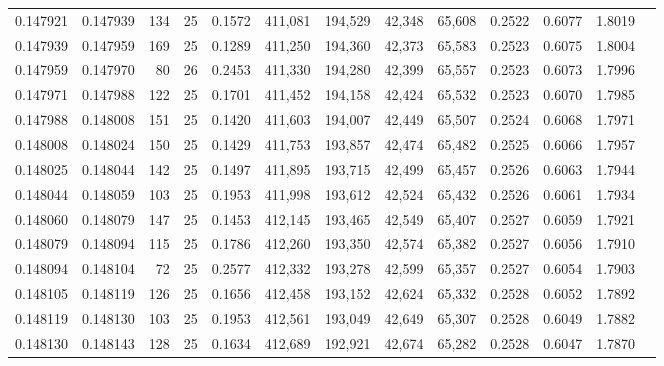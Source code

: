 \begin{tabular}{rrrrrrrrrrrrr}
0.147921 & 0.147939 &   134 &  25 &                                     0.1572 & 411,081 & 194,529 &  42,348 &  65,608 & 0.2522 & 0.6077 & 1.8019 \\
0.147939 & 0.147959 &   169 &  25 &                                     0.1289 & 411,250 & 194,360 &  42,373 &  65,583 & 0.2523 & 0.6075 & 1.8004 \\
0.147959 & 0.147970 &    80 &  26 &                                     0.2453 & 411,330 & 194,280 &  42,399 &  65,557 & 0.2523 & 0.6073 & 1.7996 \\
0.147971 & 0.147988 &   122 &  25 &                                     0.1701 & 411,452 & 194,158 &  42,424 &  65,532 & 0.2523 & 0.6070 & 1.7985 \\
0.147988 & 0.148008 &   151 &  25 &                                     0.1420 & 411,603 & 194,007 &  42,449 &  65,507 & 0.2524 & 0.6068 & 1.7971 \\
0.148008 & 0.148024 &   150 &  25 &                                     0.1429 & 411,753 & 193,857 &  42,474 &  65,482 & 0.2525 & 0.6066 & 1.7957 \\
0.148025 & 0.148044 &   142 &  25 &                                     0.1497 & 411,895 & 193,715 &  42,499 &  65,457 & 0.2526 & 0.6063 & 1.7944 \\
0.148044 & 0.148059 &   103 &  25 &                                     0.1953 & 411,998 & 193,612 &  42,524 &  65,432 & 0.2526 & 0.6061 & 1.7934 \\
0.148060 & 0.148079 &   147 &  25 &                                     0.1453 & 412,145 & 193,465 &  42,549 &  65,407 & 0.2527 & 0.6059 & 1.7921 \\
0.148079 & 0.148094 &   115 &  25 &                                     0.1786 & 412,260 & 193,350 &  42,574 &  65,382 & 0.2527 & 0.6056 & 1.7910 \\
0.148094 & 0.148104 &    72 &  25 &                                     0.2577 & 412,332 & 193,278 &  42,599 &  65,357 & 0.2527 & 0.6054 & 1.7903 \\
0.148105 & 0.148119 &   126 &  25 &                                     0.1656 & 412,458 & 193,152 &  42,624 &  65,332 & 0.2528 & 0.6052 & 1.7892 \\
0.148119 & 0.148130 &   103 &  25 &                                     0.1953 & 412,561 & 193,049 &  42,649 &  65,307 & 0.2528 & 0.6049 & 1.7882 \\
0.148130 & 0.148143 &   128 &  25 &                                     0.1634 & 412,689 & 192,921 &  42,674 &  65,282 & 0.2528 & 0.6047 & 1.7870 \\

\end{tabular}
